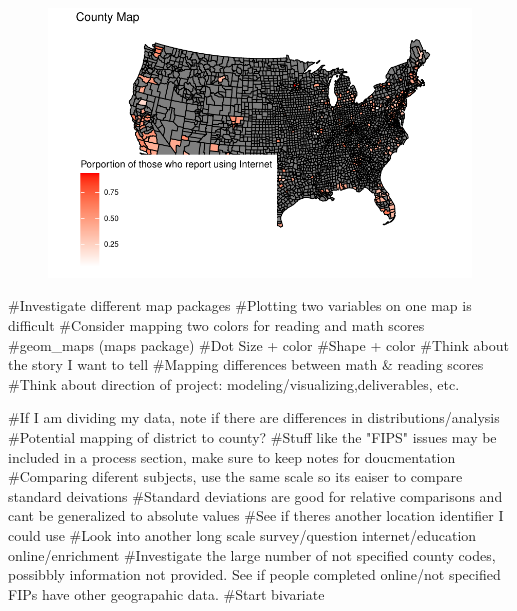 \documentclass[
  letterpaper,
  DIV=11,
  numbers=noendperiod]{scrartcl}
\newenvironment{Shaded}{\begin{snugshade}}{\end{snugshade}}
\newcommand{\CommentTok}[1]{\textcolor[rgb]{0.37,0.37,0.37}{#1}}
\begin{document}
\begin{figure}[H]

{\centering \includegraphics{GeospatialMapping_files/figure-pdf/mapping-internet-use-usmaps-package-1.pdf}

}

\end{figure}

\begin{Shaded}
\begin{Highlighting}[]
\CommentTok{\#Investigate different map packages}
\CommentTok{\#Plotting two variables on one map is difficult}
\CommentTok{\#Consider mapping two colors for reading and math scores}
\CommentTok{\#geom\_maps (maps package)}
\CommentTok{\#Dot Size + color}
\CommentTok{\#Shape + color }
\CommentTok{\#Think about the story I want to tell}
\CommentTok{\#Mapping differences between math \& reading scores}
\CommentTok{\#Think about direction of project: modeling/visualizing,deliverables, etc.}

\CommentTok{\#If I am dividing my data, note if there are differences in distributions/analysis}
\CommentTok{\#Potential mapping of district to county?}
\CommentTok{\#Stuff like the "FIPS" issues may be included in a process section, make sure to keep notes for doucmentation}
\CommentTok{\#Comparing diferent subjects, use the same scale so it\textquotesingle{}s eaiser to compare standard deivations}
\CommentTok{\#Standard deviations are good for relative comparisons and can\textquotesingle{}t be generalized to absolute values}
\CommentTok{\#See if there\textquotesingle{}s another location identifier I could use}
\CommentTok{\#Look into another long scale survey/question internet/education online/enrichment}
\CommentTok{\#Investigate the large number of not specified county codes, possibbly information not provided. See if people completed online/not specified FIPs have other geograpahic data.}
\CommentTok{\#Start bivariate }
\end{Highlighting}
\end{Shaded}
\end{document}
